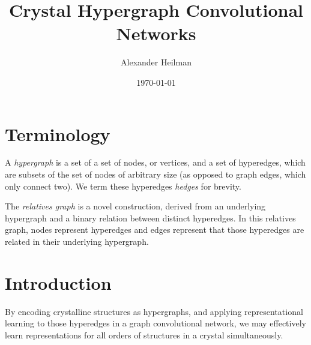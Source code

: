 \documentclass{article}
\begin{document}
 


   \title{Crystal Hypergraph Convolutional Networks}
   
   \subtitle{}

   \author{Alexander Heilman
          }


   \date{\today}

 


   \maketitle
%
\section*{Terminology}
A \textit{hypergraph} is a set of a set of nodes, or vertices, and a set
of hyperedges, which are subsets of the set of nodes of arbitrary size (as
opposed to graph edges, which only connect two).
We term these hyperedges \textit{hedges} for
brevity.

The \textit{relatives graph} is a novel construction, derived from an underlying hypergraph and a binary relation between distinct hyperedges. In this relatives graph, nodes represent hyperedges and edges represent that those hyperedges are related in their underlying hypergraph.



\section*{Introduction}
By encoding crystalline structures as hypergraphs, and applying representational
learning to those hyperedges in a graph convolutional network, we may effectively learn representations for all orders of structures in a crystal simultaneously. 
\end{document}
